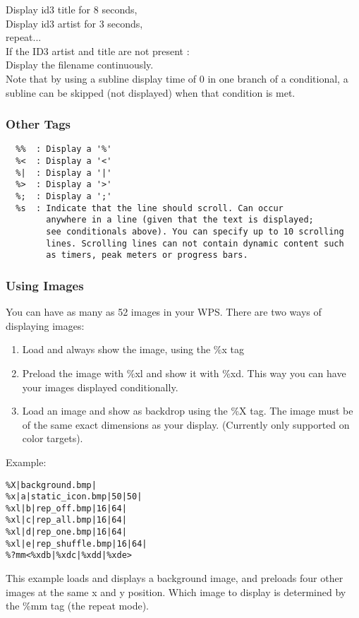 Display id3 title for 8 seconds,\\

Display id3 artist for 3 seconds,\\

repeat...\\

If the ID3 artist and title are not present :\\

Display the filename continuously.\\

Note that by using a subline display time of 0 in one branch of a conditional, a subline can be skipped (not displayed) when that condition is met. 

\subsubsection{Other Tags}
\begin{verbatim}
  %%  : Display a '%'
  %<  : Display a '<'
  %|  : Display a '|'
  %>  : Display a '>'
  %;  : Display a ';'
  %s  : Indicate that the line should scroll. Can occur
        anywhere in a line (given that the text is displayed; 
        see conditionals above). You can specify up to 10 scrolling
        lines. Scrolling lines can not contain dynamic content such 
        as timers, peak meters or progress bars.
\end{verbatim}

\subsubsection{Using Images}
You can have as many as 52 images in your WPS. There are two ways of displaying images:
\begin{enumerate}
  \item Load and always show the image, using the \%x tag
  \item Preload the image with \%xl and show it with \%xd. This way you can have your images displayed conditionally.
  \item Load an image and show as backdrop using the \%X tag. The image must be of the same exact dimensions as your display. (Currently only supported on color targets).
\end{enumerate}
Example:
\begin{verbatim}
%X|background.bmp|
%x|a|static_icon.bmp|50|50|
%xl|b|rep_off.bmp|16|64|
%xl|c|rep_all.bmp|16|64|
%xl|d|rep_one.bmp|16|64|
%xl|e|rep_shuffle.bmp|16|64|
%?mm<%xdb|%xdc|%xdd|%xde>
\end{verbatim}
This example loads and displays a background image, and preloads four other images at the same x and y position. Which image to display is determined by the \%mm tag (the repeat mode).

